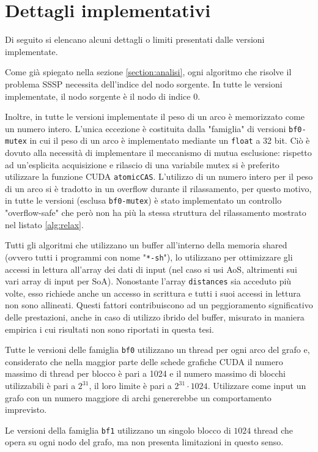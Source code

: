\documentclass[12pt,a4paper]{book} %
\begin{document}
	\chapter{Dettagli implementativi}
	\label{section:impl}
	Di seguito si elencano alcuni dettagli o limiti presentati dalle versioni implementate.
	
	Come già spiegato nella sezione \ref{section:analisi}, ogni algoritmo che risolve il problema SSSP necessita dell'indice del nodo sorgente. In tutte le versioni implementate, il nodo sorgente è il nodo di indice $0$.
	
	Inoltre, in tutte le versioni implementate il peso di un arco è memorizzato come un numero intero. L'unica eccezione è costituita dalla "famiglia" di versioni \texttt{bf0-mutex} in cui il peso di un arco è implementato mediante un \texttt{float} a 32 bit. Ciò è dovuto alla necessità di implementare il meccanismo di mutua esclusione: rispetto ad un'esplicita acquisizione e rilascio di una variabile mutex si è preferito utilizzare la funzione CUDA \texttt{atomicCAS}. L'utilizzo di un numero intero per il peso di un arco si è tradotto in un overflow durante il rilassamento, per questo motivo, in tutte le versioni (esclusa \texttt{bf0-mutex}) è stato implementato un controllo "overflow-safe" che però non ha più la stessa struttura del rilassamento mostrato nel listato \ref{alg:relax}.

	Tutti gli algoritmi che utilizzano un buffer all'interno della memoria shared (ovvero tutti i programmi con nome "\texttt{*-sh}"), lo utilizzano per ottimizzare gli accessi in lettura all'array dei dati di input (nel caso si usi AoS, altrimenti sui vari array di input per SoA). Nonostante l'array \texttt{distances} sia acceduto più volte, esso richiede anche un accesso in scrittura e tutti i suoi accessi in lettura non sono allineati. Questi fattori contribuiscono ad un peggioramento significativo delle prestazioni, anche in caso di utilizzo ibrido del buffer, misurato in maniera empirica i cui risultati non sono riportati in questa tesi.
	
	Tutte le versioni delle famiglia \texttt{bf0} utilizzano un thread per ogni arco del grafo e, considerato che nella maggior parte delle schede grafiche CUDA il numero massimo di thread per blocco è pari a 1024 e il numero massimo di blocchi utilizzabili è pari a $2^{31}$, il loro limite è pari a $2^{31}\cdot 1024$. Utilizzare come input un grafo con un numero maggiore di archi genererebbe un comportamento imprevisto.
	
	Le versioni della famiglia \texttt{bf1} utilizzano un singolo blocco di $1024$ thread che opera su ogni nodo del grafo, ma non presenta limitazioni in questo senso.
	
\end{document}
